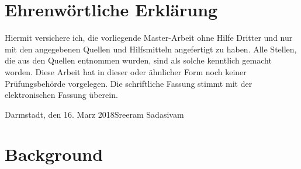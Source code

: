 \documentclass[longdoc,accentcolor=tud1b,12pt,paper=a4]{tudreport}
\title{\deedsTitle}
\subtitle{\deedsThesisType}
\newcommand{\deedsThesisType}{Master-Arbeit\xspace} %
\newcommand{\deedsName}{Sreeram Sadasivam\xspace}
\newcommand{\deedsSubmissionDate}{16. Marz 2018\xspace}%
\begin{document}
	\frenchspacing
	\raggedbottom
	\maketitle
	
	\chapter*{Ehrenw\"ortliche Erkl\"arung}
	Hiermit versichere ich, die vorliegende \deedsThesisType ohne Hilfe Dritter und nur mit den angegebenen Quellen
    und Hilfsmitteln angefertigt zu haben. Alle Stellen, die aus den Quellen entnommen wurden, sind als solche
    kenntlich gemacht worden. Diese Arbeit hat in dieser oder \"ahnlicher Form noch keiner Pr\"ufungsbeh\"orde vorgelegen.
    Die schriftliche Fassung stimmt mit der elektronischen Fassung \"uberein.
    
	
	\vspace{1.5cm}
	
	\noindent Darmstadt, den \deedsSubmissionDate\hfill \deedsName
	

	
	
	\chapter{Background \label{bkgd}}
	
	
	
	
\end{document}
